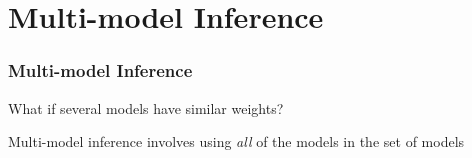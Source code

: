 \documentclass[color=usenames,dvipsnames]{beamer}\usepackage[]{graphicx}\usepackage[]{color}
\begin{document}













\section{Multi-model Inference}


\begin{frame}
  \frametitle{Multi-model Inference}
  \large
  What if several models have similar weights? \par
  \pause
  \vspace{1cm}
  Multi-model inference involves using {\it all} of the models in
    the set of models
\end{frame}
\end{document}
